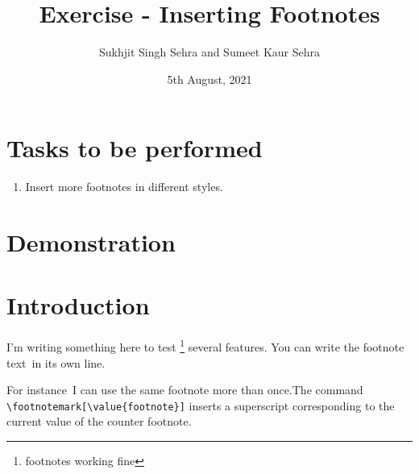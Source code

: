 \documentclass{article}
\title{Exercise - Inserting Footnotes}
\author{Sukhjit Singh Sehra and Sumeet Kaur Sehra}
\date{5th August, 2021}
\begin{document}
	\maketitle	
	\section*{Tasks to be performed}
	\begin{enumerate}	
		\item Insert more footnotes in different styles.
	\end{enumerate}
	\section*{Demonstration}

\section{Introduction}
I'm writing something here to test  \footnote{footnotes working fine} several features. You can write the footnote text\footnotemark\ in its own line.


For instance\footnotemark\ I can use the same footnote more than once\footnotemark[\value{footnote}].The command \verb|\footnotemark[\value{footnote}]| inserts a superscript corresponding to the current value of the counter footnote.


\end{document}
